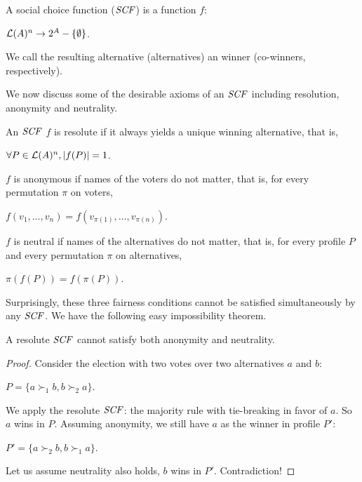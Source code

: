 \begin{definition}
	A social choice function ($\it{SCF}$) is a function $f$:
	\begin{center}
		$\mathcal{L}(A)^n \rightarrow 2^A-\{\emptyset\}$.
	\end{center}
	We call the resulting alternative (alternatives)
	an winner (co-winners, respectively).
\end{definition}

We now discuss some of the desirable axioms of an $\it{SCF}$ including
resolution, anonymity and neutrality.

\begin{definition}
	An $\it{SCF}$ $f$ is resolute if it always yields a unique winning alternative, that is,
	\begin{center}
		$\forall P \in \mathcal{L}(A)^n, |f(P)|=1$.
	\end{center}
	$f$ is anonymous if names of the voters do not matter, that is,
	for every permutation $\pi$ on voters,
	\begin{center}
		$f({v_1,\ldots,v_n}) = f(v_{\pi(1)},\ldots,v_{\pi(n)})$.
	\end{center}
	$f$ is neutral if names of the alternatives do not matter, that is,
	for every profile $P$ and every permutation $\pi$ on alternatives,
	\begin{center}
		$\pi(f(P)) = f(\pi(P))$.
	\end{center}
\end{definition}

Surprisingly, these three fairness conditions cannot be satisfied simultaneously
by any $\it{SCF}$. We have the following easy impossibility theorem.

\begin{thm}
\label{thm:easy}
	A resolute $\it{SCF}$ cannot satisfy both anonymity and neutrality.
\end{thm}
\begin{proof}
	Consider the election with two votes over two alternatives $a$ and $b$:
	\begin{center}
		$P=\{a \succ_1 b, b \succ_2 a\}$.
	\end{center}
	We apply the resolute $\it{SCF}$: the majority rule with tie-breaking in favor of $a$.
	So $a$ wins in $P$.
	Assuming anonymity, we still have $a$ as the winner in profile $P'$:
	\begin{center}
		$P'=\{a \succ_2 b,b \succ_1 a\}$.
	\end{center}
	Let us assume neutrality also holds, $b$ wins in $P'$.  Contradiction!

\end{proof}

